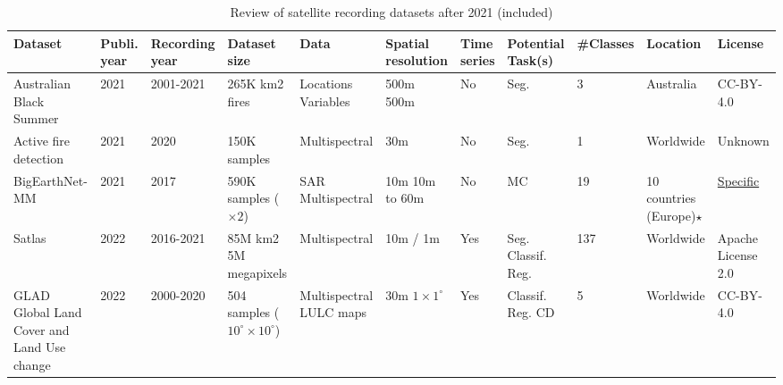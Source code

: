 \documentclass{CUP-JNL-DTM}%
\theoremstyle{definition}
\numberwithin{equation}{section}
\begin{document}
\begin{table*}[ht]
\fontsize{6.5pt}{7.5pt}\selectfont %
\renewcommand{\arraystretch}{1.5} %
\setlength\tabcolsep{5pt} %
\caption{Review of satellite recording datasets after 2021 (included)}
{\begin{fntable}
\centering
\begin{tabular}{p{1.5cm} | p{0.4cm} | p{1cm} | p{1.3cm} | p{1.2cm} : p{1cm} | p{0.4cm} | p{0.7cm} | p{0.8cm} | p{1cm} | p{1.1cm}}
\toprule
Dataset  & Publi. year & Recording year & Dataset size & Data  & Spatial resolution & Time series & Potential Task(s) & \#Classes & Location  & License  \\
\midrule

Australian Black Summer	\cite{levin_unveiling_2021} & 2021 & 2001-2021 & 265K km2  fires & Locations \newline Variables & 500m \newline 500m & No & Seg. & 3 & Australia	 & CC-BY-4.0 \\

Active fire detection \cite{de_almeida_pereira_active_2021} & 2021 & 2020 & 150K samples & Multispectral & 30m & No & Seg. & 1 & Worldwide & Unknown \\

BigEarthNet-MM	\cite{sumbul_bigearthnet-mm_2021} & 2021 & 2017  & 590K samples ($\times 2$) & SAR \newline Multispectral	& 10m \newline 10m to 60m & No & MC & 19 & 10 countries (Europe)$\star$& \href{https://bigearth.net/downloads/documents/License.pdf}{Specific} \\

Satlas \cite{bastani_satlas_2022} & 2022 & 2016-2021 & 85M km2 \newline 5M megapixels & Multispectral & 10m / 1m & Yes & Seg. \newline Classif. \newline Reg. & 137 & Worldwide & Apache License 2.0 \\

GLAD Global Land Cover and Land Use change	\cite{potapov_global_2022} & 2022 & 2000-2020 & 504 samples \newline ($10^{\circ} \times 10^{\circ}$) & Multispectral \newline LULC maps & 30m \newline $1 \times 1^{\circ}$ & Yes & Classif. \newline Reg. \newline CD & 5 & Worldwide & CC-BY-4.0 \\


\end{tabular}
\end{fntable}}
\end{table*}
\end{document}
